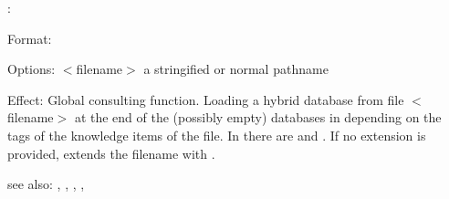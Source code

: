 \consult:

Format: 

Options: $<$filename$>$ a stringified or normal pathname

Effect: Global consulting function.
        Loading a hybrid database from file $<$filename$>$ at the end of the
        (possibly empty) databases in \COLAB{} depending on the tags of the
        knowledge items of the file.
        In \FORWARD{} there are  and .
        If no extension is provided, \COLAB{} extends the filename with .

see also: , , , \destroy, 
          \replace
